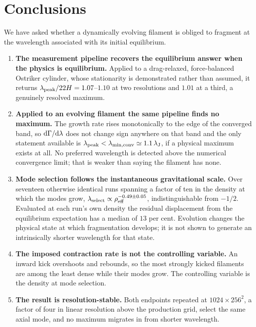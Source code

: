 \documentclass[usenatbib,twoside,twocolumn]{mnras}
\begin{document}
\section{Conclusions}
\label{sec:conclusions}

We have asked whether a dynamically evolving filament is obliged to fragment at the wavelength associated with its initial equilibrium.

\begin{enumerate}\setlength{\itemsep}{2pt}
\item \textbf{The measurement pipeline recovers the equilibrium answer when the physics is equilibrium.} Applied to a drag-relaxed, force-balanced Ostriker cylinder, whose stationarity is demonstrated rather than assumed, it returns $\lambda_{\rm peak}/22H=1.07$--$1.10$ at two resolutions and $1.01$ at a third, a genuinely resolved maximum.
\item \textbf{Applied to an evolving filament the same pipeline finds no maximum.} The growth rate rises monotonically to the edge of the converged band, so ${\rm d}\Gamma/{\rm d}\lambda$ does not change sign anywhere on that band and the only statement available is $\lambda_{\rm peak}<\lambda_{\rm min,conv}\simeq1.1\,\lambda_{\rm J}$, if a physical maximum exists at all. No preferred wavelength is detected above the numerical convergence limit; that is weaker than saying the filament has none.
\item \textbf{Mode selection follows the instantaneous gravitational scale.} Over seventeen otherwise identical runs spanning a factor of ten in the density at which the modes grow, $\lambda_{\rm select}\propto\rho_{\rm eff}^{-0.49\pm0.05}$, indistinguishable from $-1/2$. Evaluated at each run's own density the residual displacement from the equilibrium expectation has a median of $13$ per cent. Evolution changes the physical state at which fragmentation develops; it is not shown to generate an intrinsically shorter wavelength for that state.
\item \textbf{The imposed contraction rate is not the controlling variable.} An inward kick overshoots and rebounds, so the most strongly kicked filaments are among the least dense while their modes grow. The controlling variable is the density at mode selection.
\item \textbf{The result is resolution-stable.} Both endpoints repeated at $1024\times256^2$, a factor of four in linear resolution above the production grid, select the same axial mode, and no maximum migrates in from shorter wavelength.

\end{enumerate}
\end{document}
